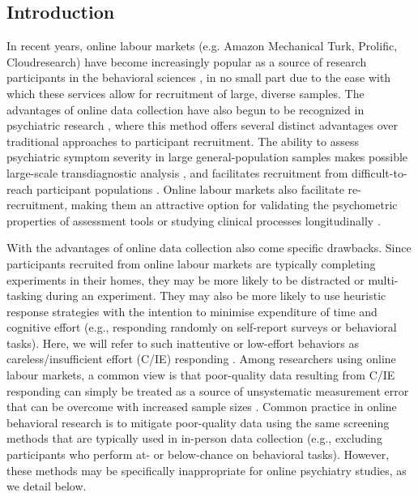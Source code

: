 \documentclass[a4paper,notitlepage,12pt]{article}
\begin{document}
\begin{refsection}[main]
\section{Introduction}

In recent years, online labour markets (e.g. Amazon Mechanical Turk, Prolific, Cloudresearch) have become increasingly popular as a source of research participants in the behavioral sciences \cite{stewart2017crowdsourcing}, in no small part due to the ease with which these services allow for recruitment of large, diverse samples. The advantages of online data collection have also begun to be recognized in psychiatric research \cite{chandler2016conducting}, where this method offers several distinct advantages over traditional approaches to participant recruitment. The ability to assess psychiatric symptom severity in large general-population samples makes possible large-scale transdiagnostic analysis \cite{gillan2016taking, rutledge2019machine}, and facilitates recruitment from difficult-to-reach participant populations \cite{strickland2019use}. Online labour markets also facilitate re-recruitment, making them an attractive option for validating the psychometric properties of assessment tools \cite{enkavi2019large} or studying clinical processes longitudinally \cite{kothe2019retention}.

With the advantages of online data collection also come specific drawbacks. Since participants recruited from online labour markets are typically completing experiments in their homes, they may be more likely to be distracted or multi-tasking during an experiment. They may also be more likely to use heuristic response strategies with the intention to minimise expenditure of time and cognitive effort (e.g., responding randomly on self-report surveys or behavioral tasks). Here, we will refer to such inattentive or low-effort behaviors as careless/insufficient effort (C/IE) responding \cite{huang2012detecting, curran2016methods}. Among researchers using online labour markets, a common view is that poor-quality data resulting from C/IE responding can simply be treated as a source of unsystematic measurement error that can be overcome with increased sample sizes \cite{gillan2016taking, chandler2020participant}. Common practice in online behavioral research is to mitigate poor-quality data using the same screening methods that are typically used in in-person data collection (e.g., excluding participants who perform at- or below-chance on behavioral tasks). However, these methods may be specifically inappropriate for online psychiatry studies, as we detail below.


\end{refsection}
\end{document}
